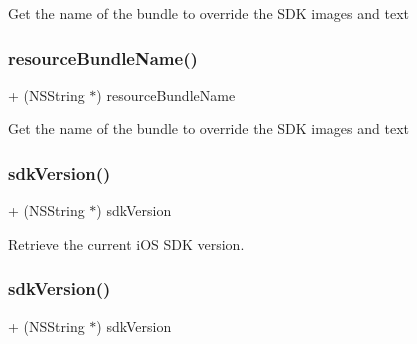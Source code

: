 Get the name of the bundle to override the S\+DK images and text \mbox{\label{interfaceFBSettings_ad87ff4e3c9577a22d9a329b12137f976}} 
\subsubsection{\texorpdfstring{resource\+Bundle\+Name()}{resourceBundleName()}\hspace{0.1cm}{\footnotesize\ttfamily [5/5]}}
{\footnotesize\ttfamily + (N\+S\+String $\ast$) resource\+Bundle\+Name \begin{DoxyParamCaption}{ }\end{DoxyParamCaption}}

Get the name of the bundle to override the S\+DK images and text \mbox{\label{interfaceFBSettings_a54528a8eee1469b7202d0e4825f08604}} 
\subsubsection{\texorpdfstring{sdk\+Version()}{sdkVersion()}\hspace{0.1cm}{\footnotesize\ttfamily [1/5]}}
{\footnotesize\ttfamily + (N\+S\+String $\ast$) sdk\+Version \begin{DoxyParamCaption}{ }\end{DoxyParamCaption}}

Retrieve the current i\+OS S\+DK version. \mbox{\label{interfaceFBSettings_a54528a8eee1469b7202d0e4825f08604}} 
\subsubsection{\texorpdfstring{sdk\+Version()}{sdkVersion()}\hspace{0.1cm}{\footnotesize\ttfamily [2/5]}}
{\footnotesize\ttfamily + (N\+S\+String $\ast$) sdk\+Version \begin{DoxyParamCaption}{ }\end{DoxyParamCaption}}

